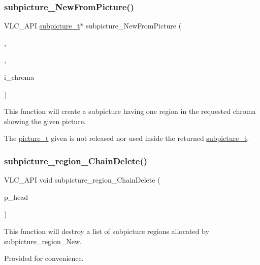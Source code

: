 \subsubsection{\texorpdfstring{subpicture\+\_\+\+New\+From\+Picture()}{subpicture\_NewFromPicture()}}
{\footnotesize\ttfamily V\+L\+C\+\_\+\+A\+PI \hyperlink{structsubpicture__t}{subpicture\+\_\+t}$\ast$ subpicture\+\_\+\+New\+From\+Picture (\begin{DoxyParamCaption}\item[{\hyperlink{structvlc__object__t}{vlc\+\_\+object\+\_\+t} $\ast$}]{,  }\item[{\hyperlink{structpicture__t}{picture\+\_\+t} $\ast$}]{,  }\item[{\hyperlink{vlc__common_8h_af49f89d0f752bc9cff142e43b1bd634d}{vlc\+\_\+fourcc\+\_\+t}}]{i\+\_\+chroma }\end{DoxyParamCaption})}

This function will create a subpicture having one region in the requested chroma showing the given picture.

The \hyperlink{structpicture__t}{picture\+\_\+t} given is not released nor used inside the returned \hyperlink{structsubpicture__t}{subpicture\+\_\+t}. \mbox{\label{group__subpicture_gac38fccf7b141ea5d16d875d05412dace}} 
\subsubsection{\texorpdfstring{subpicture\+\_\+region\+\_\+\+Chain\+Delete()}{subpicture\_region\_ChainDelete()}}
{\footnotesize\ttfamily V\+L\+C\+\_\+\+A\+PI void subpicture\+\_\+region\+\_\+\+Chain\+Delete (\begin{DoxyParamCaption}\item[{\hyperlink{structsubpicture__region__t}{subpicture\+\_\+region\+\_\+t} $\ast$}]{p\+\_\+head }\end{DoxyParamCaption})}

This function will destroy a list of subpicture regions allocated by subpicture\+\_\+region\+\_\+\+New.

Provided for convenience. \mbox{\label{group__subpicture_gacac77af39686761bc175d12b769c3dfb}} 
